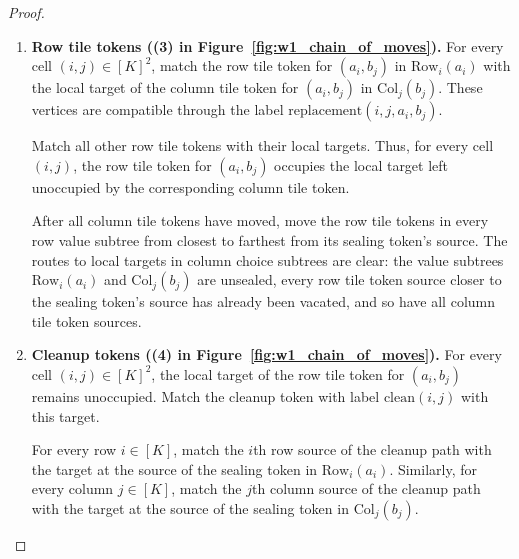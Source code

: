 \documentclass[a4paper,USenglish,thm-restate]{lipics-v2021}
\newcommand{\rowsub}{\mathrm{Row}}
\newcommand{\colsub}{\mathrm{Col}}
\theoremstyle{problemstyle}
\begin{document}
\begin{proof}
\begin{enumerate}
Match all other column tile tokens with their local targets. Thus, the local target of the column tile token for $(a_i,b_j)$ remains unoccupied, whereas all other local targets of column tile tokens are occupied by the corresponding tile tokens.

In each column value subtree, move the column tile tokens from closest to farthest from the source of the value subtree's sealing token. The routes of the column tile tokens moved to the tile subtree are clear because the relevant value subtrees are unsealed and every tile token source closer to the sealing token's source has already been vacated. Since the targets in the tile subtree and the local targets of column tile tokens are leaves (Observation~\ref{obs:value-subtree-attachment}), occupying one of these targets does not block a later route of a column tile token.

\item \textbf{Row tile tokens ((3) in Figure~\ref{fig:w1_chain_of_moves}).}
For every cell $(i,j)\in[K]^2$, match the row tile token for $(a_i,b_j)$ in $\rowsub_i(a_i)$ with the local target of the column tile token for $(a_i,b_j)$ in $\colsub_j(b_j)$. These vertices are compatible through the label $\mathrm{replacement}(i,j,a_i,b_j)$.

Match all other row tile tokens with their local targets. Thus, for every cell $(i,j)$, the row tile token for $(a_i,b_j)$ occupies the local target left unoccupied by the corresponding column tile token.

After all column tile tokens have moved, move the row tile tokens in every row value subtree from closest to farthest from its sealing token's source. The routes to local targets in column choice subtrees are clear: the value subtrees $\rowsub_i(a_i)$ and $\colsub_j(b_j)$ are unsealed, every row tile token source closer to the sealing token's source has already been vacated, and so have all column tile token sources.

\item \textbf{Cleanup tokens ((4) in Figure~\ref{fig:w1_chain_of_moves}).}
For every cell $(i,j)\in[K]^2$, the local target of the row tile token for $(a_i,b_j)$ remains unoccupied. Match the cleanup token with label $\mathrm{clean}(i,j)$ with this target.

For every row $i\in[K]$, match the $i$th row source of the cleanup path with the target at the source of the sealing token in $\rowsub_i(a_i)$. Similarly, for every column $j\in[K]$, match the $j$th column source of the cleanup path with the target at the source of the sealing token in $\colsub_j(b_j)$.


\end{enumerate}
\end{proof}
\end{document}
